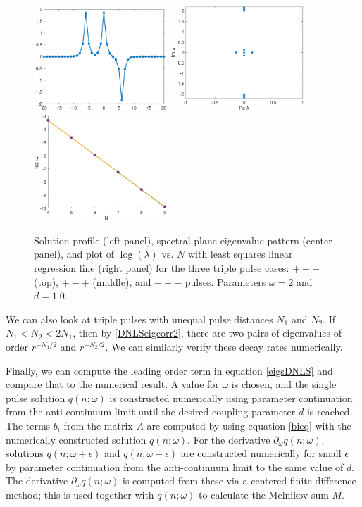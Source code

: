 \documentclass[12pt]{elsarticle}
\begin{document}
\begin{figure}
\includegraphics[width=5cm]{dnlsPPM.eps}
\includegraphics[width=5cm]{dnlsPPMeig.eps}
\includegraphics[width=5cm]{dnlsPPMdecay.eps}
\caption{Solution profile (left panel), spectral plane eigenvalue pattern (center panel), and plot of $\log(\lambda)$ vs. $N$ with least squares linear regression line (right panel) for the three triple pulse cases: $+++$ (top), $+-+$ (middle), and $++-$ pulses. Parameters $\omega = 2$ and $d = 1.0$.}
\label{fig:eigendecay2}
\end{figure}

We can also look at triple pulses with unequal pulse distances $N_1$ and $N_2$. If $N_1 < N_2 < 2 N_1$, then by \cref{DNLSeigcorr2}, there are two pairs of eigenvalues of order $r^{-N_1/2}$ and $r^{-N_2/2}$. We can similarly verify these decay rates numerically.

Finally, we can compute the leading order term in equation \cref{eigsDNLS} and compare that to the numerical result. A value for $\omega$ is chosen, and the single pulse solution $q(n; \omega)$ is constructed numerically using parameter continuation from the anti-continuum limit until the desired coupling parameter $d$ is reached. The terms $b_i$ from the matrix $A$ are computed by using equation \cref{bieq} with the numerically constructed solution $q(n; \omega)$. For the derivative $\partial_\omega q(n; \omega)$, solutions $q(n; \omega + \epsilon)$ and $q(n; \omega - \epsilon)$ are constructed numerically for small $\epsilon$ by parameter continuation from the anti-continuum limit to the same value of $d$. The derivative $\partial_\omega q(n; \omega)$ is computed from these via a centered finite difference method; this is used together with $q(n; \omega)$ to calculate the Melnikov sum $M$. 
\end{document}
